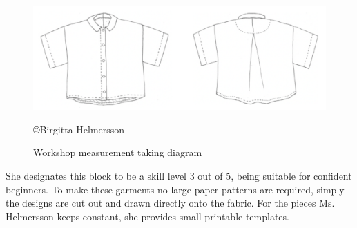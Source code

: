 \begin{figure} [H] %
    \centering %
    \includegraphics[width = \textwidth]{Images/finishedgarmentsilhoutte.png} %
    \caption{Workshop measurement taking diagram}
    \copyright {Birgitta Helmersson} %
\end{figure}
She designates this block to be a skill level 3 out of 5, being suitable for confident beginners. To make these garments no large paper patterns are required, simply the designs are cut out and drawn directly onto the fabric. For the pieces Ms. Helmersson keeps constant, she provides small printable templates.

